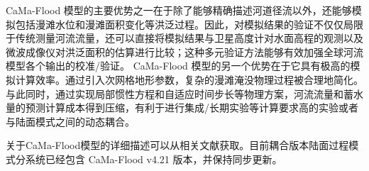 CaMa-Flood 模型的主要优势之一在于除了能够精确描述河道径流以外，还能够模拟包括漫滩水位和漫滩面积变化等洪泛过程。因此，对模拟结果的验证不仅仅局限于传统测量河流流量，还可以直接将模拟结果与卫星高度计对水面高程的观测以及微波成像仪对洪泛面积的估算进行比较；这种多元验证方法能够有效加强全球河流模型各个输出的校准/验证\citep{yamazaki2012adjustment,yamazaki2012analysis}。
CaMa-Flood 模型的另一个优势在于它具有极高的模拟计算效率。通过引入次网格地形参数，复杂的漫滩淹没物理过程被合理地简化。与此同时，通过实现局部惯性方程和自适应时间步长等物理方案\citep{bates2010}，河流流量和蓄水量的预测计算成本得到压缩，有利于进行集成/长期实验等计算要求高的实验或者与陆面模式之间的动态耦合。


关于CaMa-Flood模型的详细描述可以从相关文献获取\citep{yamazaki2011physically,yamazaki2013improving,yamazaki2014regional,yamazaki2014development}。目前耦合版本陆面过程模式分系统已经包含 CaMa-Flood v4.21 版本，并保持同步更新。


